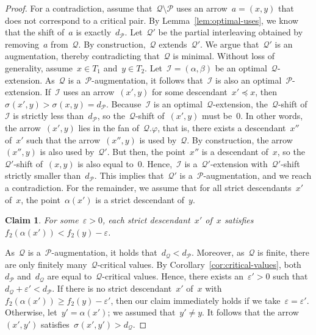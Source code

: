 \documentclass[11pt]{article}
\makeatletter
\newtheorem{claim}[theorem]{Claim}
\newcommand{\shift}[1]{\sigma_{#1}}
\newcommand{\resdist}[1]{d_{#1}}
\newcommand{\eps}{\varepsilon}
\renewcommand{\phi}{\varphi}
\newcommand{\I}{\mathcal{I}}
\renewcommand{\P}{\mathcal{P}}
\newcommand{\Q}{\mathcal{Q}}
\newenvironment{claimproof}[1][\proofname]{
  \pushQED{\qed}%
  \normalfont \topsep6\p@\@plus6\p@\relax
  \trivlist
  \item[\hskip\labelsep
        \color{lipicsGray}\sffamily
    #1\@addpunct{.}]\ignorespaces
}{%
  \renewcommand\qedsymbol{\textcolor{lipicsGray}{\ensuremath{\vartriangleleft}}}
  \popQED\endtrivlist%
  \renewcommand\qedsymbol{\textcolor{lipicsGray}{\ensuremath{\blacktriangleleft}}}
}
\makeatother
\begin{document}
\begin{proof}
    For a contradiction, assume that~$\Q \setminus \P$ uses an arrow~$a = (x, y)$ that does not correspond to a critical pair.
    By Lemma~\ref{lem:optimal-uses}, we know that the shift of~$a$ is exactly~$\resdist{\P}$.
    Let~$\Q'$ be the partial interleaving obtained by removing~$a$ from~$\Q$.
    By construction,~$\Q$ extends~$\Q'$.
    We argue that~$\Q'$ is an augmentation, thereby contradicting that~$\Q$ is minimal.
    Without loss of generality, assume~$x \in T_1$ and~$y \in T_2$.    
    Let~$\I = (\alpha, \beta)$ be an optimal~$\Q$-extension.
    As~$\Q$ is a~$\P$-augmentation, it follows that~$\I$ is also an optimal~$\P$-extension.
%
    If~$\I$ uses an arrow~$(x', y)$ for some descendant~$x'\preceq x$, then~$\shift{}(x', y) > \shift{}(x, y) = \resdist{\P}$.
    Because~$\I$ is an optimal~$\Q$-extension, the~$\Q$-shift of~$\I$ is strictly less than~$\resdist{\P}$, so the~$\Q$-shift of~$(x', y)$ must be~$0$.
    In other words, the arrow~$(x', y)$ lies in the fan of~$\Q.\phi$, that is, there exists a descendant~$x''$ of~$x'$ such that the arrow~$(x'', y)$ is used by~$\Q$.
    By construction, the arrow~$(x'', y)$ is also used by~$\Q'$.
    But then, the point~$x''$ is a descendant of~$x$, so the~$\Q'$-shift of~$(x, y)$ is also equal to~$0$.
    Hence,~$\I$ is a~$\Q'$-extension with~$\Q'$-shift strictly smaller than~$\resdist{\P}$.
    This implies that~$\Q'$ is a~$\P$-augmentation, and we reach a contradiction.
    For the remainder, we assume that for all strict descendants~$x'$ of~$x$, the point~$\alpha(x')$ is a strict descendant of~$y$.
%
    \begin{claim}\label{claim:A}
        For some~$\eps > 0$, each strict descendant~$x'$ of~$x$ satisfies~$f_2(\alpha(x')) < f_2(y) - \eps$.
    \end{claim}
    \begin{claimproof}
    As~$\Q$ is a~$\P$-augmentation, it holds that~$\resdist{\Q} < \resdist{\P}$.
    Moreover, as~$\Q$ is finite, there are only finitely many~$\Q$-critical values.
    By Corollary~\ref{cor:critical-values}, both~$\resdist{\P}$ and~$\resdist{\Q}$ are equal to~$\Q$-critical values.
    Hence, there exists an~$\eps' > 0$ such that~$\resdist{\Q} + \eps' < \resdist{\P}$.
    If there is no strict descendant~$x'$ of~$x$ with~$f_2(\alpha(x')) \ge f_2(y) - \eps'$, then our claim immediately holds if we take~$\eps = \eps'$.
    Otherwise, let~$y' = \alpha(x')$; we assumed that~$y' \neq y$.
    It follows that the arrow~$(x', y')$ satisfies~$\shift{}(x', y') > \resdist{\Q}$.

\end{claimproof}
\end{proof}
\end{document}
